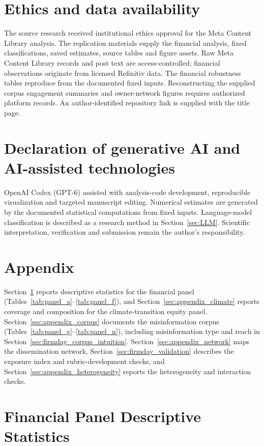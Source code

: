 \documentclass{article}
\theoremstyle{plain}
\begin{document}
\section*{Ethics and data availability}
The source research received institutional ethics approval for the Meta Content Library analysis. The replication materials supply the financial analysis, fixed classifications, saved estimates, source tables and figure assets. Raw Meta Content Library records and post text are access-controlled; financial observations originate from licensed Refinitiv data. The financial robustness tables reproduce from the documented fixed inputs. Reconstructing the supplied corpus engagement summaries and owner-network figures requires authorized platform records. An author-identified repository link is supplied with the title page.
\section*{Declaration of generative AI and AI-assisted technologies}
OpenAI Codex (GPT-6) assisted with analysis-code development, reproducible visualization and targeted manuscript editing. Numerical estimates are generated by the documented statistical computations from fixed inputs. Language-model classification is described as a research method in Section~\ref{sec:LLM}. Scientific interpretation, verification and submission remain the author's responsibility.

\printbibliography

\appendix
\section*{Appendix}
Section~\ref{sec:appendix_financial} reports descriptive statistics for the financial panel (Tables~\ref{tab:panel_a}--\ref{tab:panel_f}), and Section~\ref{sec:appendix_climate} reports coverage and composition for the climate-transition equity panel. Section~\ref{sec:appendix_corpus} documents the misinformation corpus (Tables~\ref{tab:panel_g}--\ref{tab:panel_n}), including misinformation type and reach in Section~\ref{sec:firmday_corpus_intuition}. Section~\ref{sec:appendix_network} maps the dissemination network, Section~\ref{sec:firmday_validation} describes the exposure index and rubric-development checks, and Section~\ref{sec:appendix_heterogeneity} reports the heterogeneity and interaction checks.

\section{Financial Panel Descriptive Statistics}
\label{sec:appendix_financial}
\end{document}
